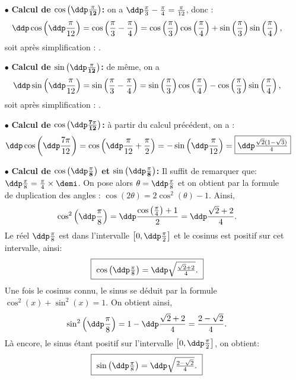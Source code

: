 \begin{correction}
\begin{itemize}
\item[$\bullet$] \textbf{Calcul de $\mathbf{\cos{\left(\ddp\frac{\pi}{12}\right)}}$:} on a $\ddp \frac{\pi}{3}-\frac{\pi}{4} = \frac{\pi}{12}$, donc :
$$\ddp \cos\left(\ddp\frac{\pi}{12}\right) = \cos\left(\frac{\pi}{3}-\frac{\pi}{4}\right) = \cos \left(\frac{\pi}{3}\right)\cos \left(\frac{\pi}{4}\right) + \sin \left(\frac{\pi}{3}\right)\sin \left(\frac{\pi}{4}\right),$$
soit apr\`es simplification : .
\item[$\bullet$] \textbf{Calcul de $\mathbf{\sin{\left(\ddp\frac{\pi}{12}\right)}}$:}  de m\^eme, on a 
$$\ddp \sin\left(\ddp\frac{\pi}{12}\right) = \sin\left(\frac{\pi}{3}-\frac{\pi}{4}\right) = \sin \left(\frac{\pi}{3}\right)\cos \left(\frac{\pi}{4}\right) - \cos \left(\frac{\pi}{3}\right)\sin \left(\frac{\pi}{4}\right),$$
soit apr\`es simplification : .
\item[$\bullet$] \textbf{Calcul de $\mathbf{\cos{\left(\ddp\frac{7\pi}{12}\right)}}$:} \`a partir du calcul pr\'ec\'edent, on a :
$$\ddp \cos{\left(\ddp\frac{7\pi}{12}\right)} = \cos{\left(\ddp\frac{\pi}{12}+\frac{\pi}{2}\right)} = -\sin{\left(\ddp\frac{\pi}{12}\right)} = \fbox{$\ddp \frac{\sqrt{2}(1-\sqrt{3})}{4}$}$$
\item[$\bullet$] \textbf{Calcul de $\mathbf{\cos{\left(\ddp\frac{\pi}{8}\right)}}$ et $\mathbf{\sin{\left(\ddp\frac{\pi}{8}\right)}}$:}  Il suffit de remarquer que: $\ddp\frac{\pi}{8}=\frac{\pi}{4}\times \demi$. On pose alors $\theta=\ddp\frac{\pi}{8}$ et on obtient par la formule de duplication des angles : $\cos{(2\theta)}=2\cos^2{(\theta)}-1.$
Ainsi, 
$$\cos^2{\left(\ddp\frac{\pi}{8}\right)}=\ddp\frac{\cos{\left(\frac{\pi}{4}\right)}+1}{2}=\ddp\frac{\sqrt{2}+2}{4}.$$
Le r\'eel $\ddp\frac{\pi}{8}$ est dans l'intervalle $\left\lbrack 0,\ddp\frac{\pi}{2}\right\rbrack$ et le cosinus est positif sur cet intervalle, ainsi: 
\begin{equation*}
\fbox{
$\cos{\left(\ddp\frac{\pi}{8}\right)}=\ddp\sqrt{\frac{\sqrt{2}+2}{4}}.$
}
\end{equation*}
Une fois le cosinus connu, le sinus se d\'eduit par la formule $\cos^2{(x)}+\sin^2{(x)}=1$. On obtient ainsi, 
$$\sin^2{\left(\ddp\frac{\pi}{8}\right)}=1-\ddp \frac{\sqrt{2}+2}{4} = \frac{2-\sqrt{2}}{4}.$$
L\`a encore, le sinus \'etant positif sur l'intervalle $\left\lbrack 0,\ddp\frac{\pi}{2}\right\rbrack$, on obtient: 
\begin{equation*}
\fbox{
$\sin{\left(\ddp\frac{\pi}{8}\right)}=\ddp\sqrt{\frac{2-\sqrt{2}}{4}}.$
}
\end{equation*}
\end{itemize}
\end{correction}

\newpage


